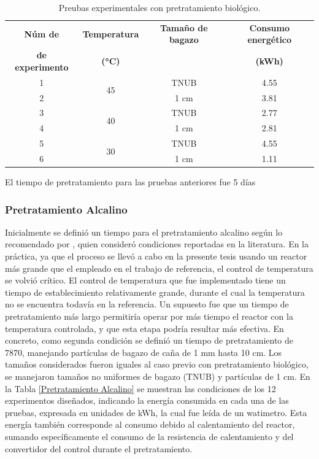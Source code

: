 \documentclass[12pt]{article}
\begin{document}
	\begin{table}[H]
		\centering
		\caption{Preubas experimentales con pretratamiento biológico.}
		\begin{tabular}{|c|c|c|c|}
			\hline
			\textbf{Núm de} &\textbf{ Temperatura} & \textbf{Tamaño de bagazo} & \textbf{Consumo energético } \\ 
			\textbf{de experimento} &\textbf{  (°C)} &  & \textbf{ (kWh)} \\ \hline
			1 & \multirow{2}{*}{45} & TNUB & 4.55 \\ \cline{1-1} \cline{3-4}
			2 &  & 1 cm & 3.81 \\ \hline
			3 &\multirow{2}{*}{ 40} & TNUB & 2.77 \\ \cline{3-4} \cline{1-1}
			4 &  & 1 cm & 2.81 \\ \hline
			5 &\multirow{2}{*}{ 30} & TNUB & 4.55 \\ \cline{3-4}\cline{1-1}
			6 &  & 1 cm & 1.11 \\ \hline
		\end{tabular}
		\label{Pretratamiento Biológico}
	\end{table}
	
	El tiempo de pretratamiento para las pruebas anteriores fue 5 días
		
		\subsubsection{Pretratamiento Alcalino}
		
		
		Inicialmente se definió un tiempo para el pretratamiento alcalino según lo recomendado por \cite{Arturo2022evaluacion}, quien consideró condiciones reportadas en la literatura. En la práctica, ya que el proceso se llevó a cabo en la presente tesis usando un reactor más grande que el empleado en el trabajo de referencia, el control de temperatura se volvió crítico. El control de temperatura que fue implementado tiene un tiempo de establecimiento relativamente grande, durante el cual la temperatura no se encuentra todavía en la referencia. Un supuesto fue que un tiempo de pretratamiento más largo permitiría operar por más tiempo el reactor con la temperatura controlada, y que esta etapa podría resultar más efectiva. En concreto, como segunda condición se definió un tiempo de pretratamiento de 7870, manejando partículas de bagazo de caña de 1 mm hasta 10 cm. Los tamaños considerados fueron iguales al caso previo con pretratamiento biológico, se manejaron tamaños no uniformes de bagazo (TNUB) y partículas de 1 cm. En la Tabla \ref{Pretratamiento Alcalino} se muestran las condiciones de los 12 experimentos diseñados, indicando la energía consumida en cada una de las pruebas, expresada en unidades de kWh, la cual fue leída de un watimetro. Esta energía también corresponde al consumo debido al calentamiento del reactor, sumando específicamente el consumo de la resistencia de calentamiento y del convertidor del control durante el pretratamiento.
		
\end{document}
